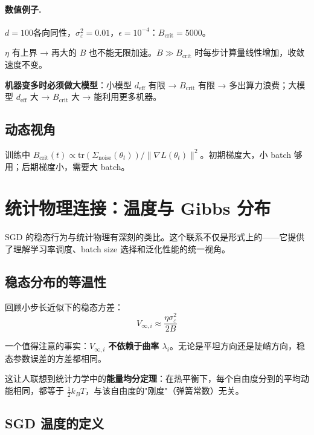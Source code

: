 \documentclass[12pt, a4paper]{ctexart}
\begin{document}
\paragraph{数值例子.} $d=100$各向同性，$\sigma_\varepsilon^2=0.01$，$\epsilon=10^{-4}$：$B_{\text{crit}} = 5000$。

\begin{keypoint}
$\eta$ 有上界 → 再大的 $B$ 也不能无限加速。$B \gg B_{\text{crit}}$ 时每步计算量线性增加，收敛速度不变。

\textbf{机器变多时必须做大模型}：小模型 $d_{\text{eff}}$ 有限 → $B_{\text{crit}}$ 有限 → 多出算力浪费；大模型 $d_{\text{eff}}$ 大 → $B_{\text{crit}}$ 大 → 能利用更多机器。
\end{keypoint}

\subsection{动态视角}

训练中 $B_{\text{crit}}(t) \propto \text{tr}(\Sigma_{\text{noise}}(\theta_t))/\|\nabla L(\theta_t)\|^2$。初期梯度大，小 batch 够用；后期梯度小，需要大 batch。


\section{统计物理连接：温度与 Gibbs 分布}

SGD 的稳态行为与统计物理有深刻的类比。这个联系不仅是形式上的——它提供了理解学习率调度、batch size 选择和泛化性能的统一视角。

\subsection{稳态分布的等温性}

回顾小步长近似下的稳态方差：
\begin{equation}
    V_{\infty,i} \approx \frac{\eta\sigma_\varepsilon^2}{2B}
\end{equation}

一个值得注意的事实：$V_{\infty,i}$ \textbf{不依赖于曲率 $\lambda_i$}。无论是平坦方向还是陡峭方向，稳态参数误差的方差都相同。

这让人联想到统计力学中的\textbf{能量均分定理}：在热平衡下，每个自由度分到的平均动能相同，都等于 $\frac{1}{2}k_B T$，与该自由度的"刚度"（弹簧常数）无关。

\subsection{SGD 温度的定义}
\end{document}
